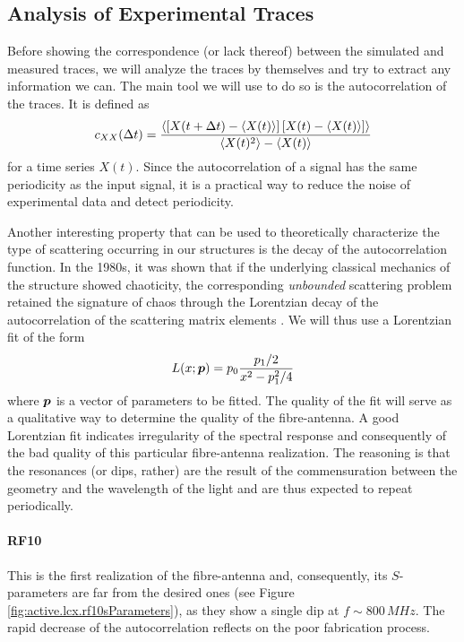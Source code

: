 \subsection{Analysis of Experimental Traces}
Before showing the correspondence (or lack thereof) between the
simulated and measured traces, we will analyze the traces by themselves
and try to extract any information we can. The main tool 
we will use to do so is the autocorrelation of the traces. It is defined
as 
	\begin{equation}
		c_{XX}(\Delta t) = \frac{\left\langle\left[X(t+\Delta t)-\left\langle X(t)\right\rangle\right]\left[X(t)-\left\langle X(t)\right\rangle\right]\right\rangle}{\left\langle X(t)^2\right\rangle-\left\langle X(t)\right\rangle}
	\end{equation}
for a time series $X(t)$. Since the autocorrelation of a signal has the same periodicity
as the input signal, it is a practical way to reduce the noise of experimental
data and detect periodicity. 

Another interesting property that can be used to theoretically characterize
the type of scattering occurring in our structures is the decay of the 
autocorrelation function. In the 1980s, it was shown that if the underlying
classical mechanics of the structure showed chaoticity, the corresponding
\textit{unbounded} scattering problem retained the signature of chaos 
through the Lorentzian decay of the autocorrelation of the scattering matrix 
elements \cite{BLU1988}. We will thus use a Lorentzian fit of the form 
	\begin{equation}
		L(x;\boldsymbol{p}) = p_0 \frac{p_1/2}{x^2-p_1^2/4}
	\end{equation}
where $\boldsymbol{p}$ is a vector of parameters to be fitted. The quality of the
fit will serve as a qualitative way to determine the quality of the
fibre-antenna. A good Lorentzian fit indicates irregularity of the spectral
response and consequently of the bad quality of this particular fibre-antenna
realization. The reasoning is that the resonances (or dips, rather) are the result
of the commensuration between the geometry and the wavelength of the light and 
are thus expected to repeat periodically. 

\paragraph{RF10}
This is the first realization of the fibre-antenna and, 
consequently, its $S$-parameters are far from the desired
ones (see Figure \ref{fig:active.lcx.rf10sParameters}), as they
show a single dip at $f\sim800\,\unit{MHz}$. The rapid decrease
of the autocorrelation reflects on the poor fabrication process.

